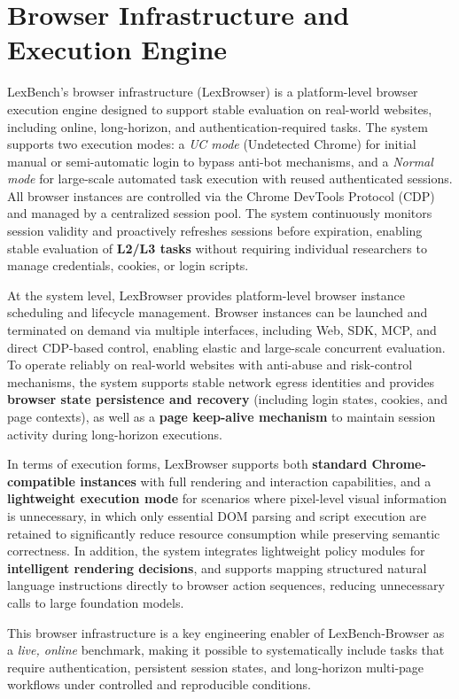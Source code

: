 \section{Browser Infrastructure and Execution Engine}

LexBench's browser infrastructure (LexBrowser) is a platform-level browser execution engine designed to support stable evaluation on real-world websites, including online, long-horizon, and authentication-required tasks. The system supports two execution modes: a \textit{UC mode} (Undetected Chrome) for initial manual or semi-automatic login to bypass anti-bot mechanisms, and a \textit{Normal mode} for large-scale automated task execution with reused authenticated sessions. All browser instances are controlled via the Chrome DevTools Protocol (CDP) and managed by a centralized session pool. The system continuously monitors session validity and proactively refreshes sessions before expiration, enabling stable evaluation of \textbf{L2/L3 tasks} without requiring individual researchers to manage credentials, cookies, or login scripts.

At the system level, LexBrowser provides platform-level browser instance scheduling and lifecycle management. Browser instances can be launched and terminated on demand via multiple interfaces, including Web, SDK, MCP, and direct CDP-based control, enabling elastic and large-scale concurrent evaluation. To operate reliably on real-world websites with anti-abuse and risk-control mechanisms, the system supports stable network egress identities and provides \textbf{browser state persistence and recovery} (including login states, cookies, and page contexts), as well as a \textbf{page keep-alive mechanism} to maintain session activity during long-horizon executions.

In terms of execution forms, LexBrowser supports both \textbf{standard Chrome-compatible instances} with full rendering and interaction capabilities, and a \textbf{lightweight execution mode} for scenarios where pixel-level visual information is unnecessary, in which only essential DOM parsing and script execution are retained to significantly reduce resource consumption while preserving semantic correctness. In addition, the system integrates lightweight policy modules for \textbf{intelligent rendering decisions}, and supports mapping structured natural language instructions directly to browser action sequences, reducing unnecessary calls to large foundation models.

This browser infrastructure is a key engineering enabler of LexBench-Browser as a \emph{live, online} benchmark, making it possible to systematically include tasks that require authentication, persistent session states, and long-horizon multi-page workflows under controlled and reproducible conditions.

